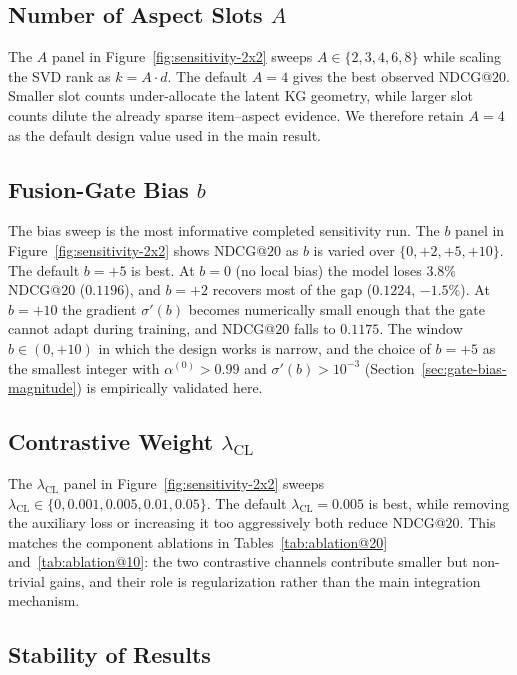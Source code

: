 \subsection{Number of Aspect Slots $A$}
\label{sec:sens-A}

The $A$ panel in Figure~\ref{fig:sensitivity-2x2} sweeps $A \in \{2, 3, 4, 6, 8\}$ while scaling the SVD rank as $k = A \cdot d$. The default $A = 4$ gives the best observed NDCG@$20$. Smaller slot counts under-allocate the latent KG geometry, while larger slot counts dilute the already sparse item--aspect evidence. We therefore retain $A = 4$ as the default design value used in the main result.

\subsection{Fusion-Gate Bias $b$}
\label{sec:sens-bias}

The bias sweep is the most informative completed sensitivity run. The $b$ panel in Figure~\ref{fig:sensitivity-2x2} shows NDCG@$20$ as $b$ is varied over $\{0, +2, +5, +10\}$. The default $b = +5$ is best. At $b = 0$ (no local bias) the model loses $3.8\%$ NDCG@$20$ ($0.1196$), and $b = +2$ recovers most of the gap ($0.1224$, $-1.5\%$). At $b = +10$ the gradient $\sigma'(b)$ becomes numerically small enough that the gate cannot adapt during training, and NDCG@$20$ falls to $0.1175$. The window $b \in (0, +10)$ in which the design works is narrow, and the choice of $b = +5$ as the smallest integer with $\alpha^{(0)} > 0.99$ and $\sigma'(b) > 10^{-3}$ (Section~\ref{sec:gate-bias-magnitude}) is empirically validated here.

\subsection{Contrastive Weight $\lambda_{\mathrm{CL}}$}
\label{sec:sens-lambda}

The $\lambda_{\mathrm{CL}}$ panel in Figure~\ref{fig:sensitivity-2x2} sweeps $\lambda_{\mathrm{CL}} \in \{0, 0.001, 0.005, 0.01, 0.05\}$. The default $\lambda_{\mathrm{CL}} = 0.005$ is best, while removing the auxiliary loss or increasing it too aggressively both reduce NDCG@$20$. This matches the component ablations in Tables~\ref{tab:ablation@20} and~\ref{tab:ablation@10}: the two contrastive channels contribute smaller but non-trivial gains, and their role is regularization rather than the main integration mechanism.

\subsection{Stability of Results}
\label{sec:eval-seed}

